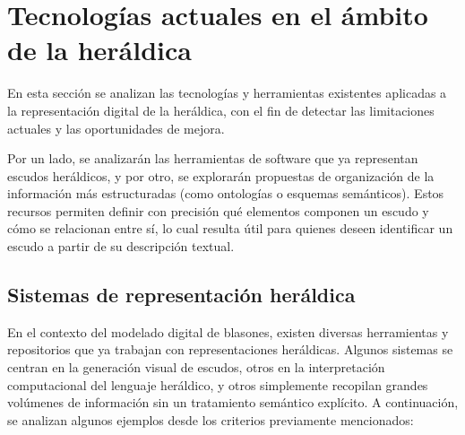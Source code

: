 \section{Tecnologías actuales en el ámbito de la heráldica}
En esta sección se analizan las tecnologías y herramientas existentes aplicadas a la representación
digital de la heráldica, con el fin de detectar las limitaciones actuales y las oportunidades
de mejora.

Por un lado, se analizarán las herramientas de software que ya representan escudos heráldicos,
y por otro, se explorarán propuestas de organización de la información más estructuradas
(como ontologías o esquemas semánticos). Estos recursos permiten definir con precisión
qué elementos componen un escudo y cómo se relacionan entre sí, lo cual resulta útil para
quienes deseen identificar un escudo a partir de su descripción textual.

\subsection{Sistemas de representación heráldica}
En el contexto del modelado digital de blasones, existen diversas herramientas y repositorios
que ya trabajan con representaciones heráldicas. Algunos sistemas se centran en la generación 
visual de escudos, otros en la interpretación computacional del lenguaje heráldico, y otros 
simplemente recopilan grandes volúmenes de información sin un tratamiento semántico explícito. 
A continuación, se analizan algunos ejemplos desde los criterios previamente mencionados:

